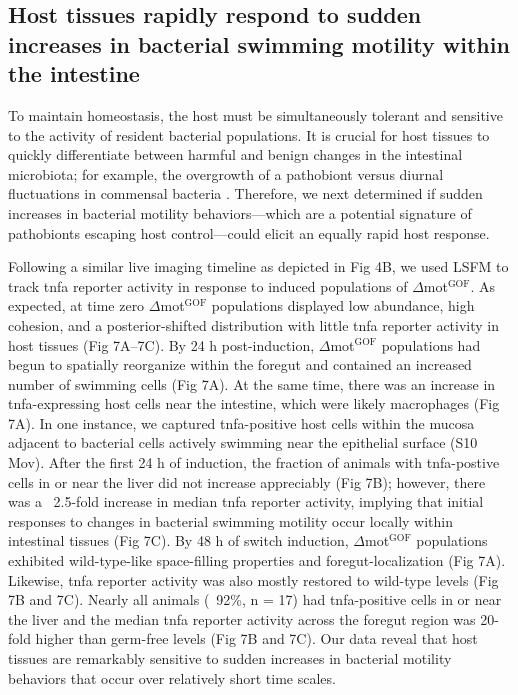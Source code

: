 \subsection{Host tissues rapidly respond to sudden increases in bacterial swimming motility within the intestine} 
To maintain homeostasis, the host must be simultaneously tolerant and sensitive to the activity of resident bacterial populations. It is crucial for host tissues to quickly differentiate between harmful and benign changes in the intestinal microbiota; for example, the overgrowth of a pathobiont versus diurnal fluctuations in commensal bacteria \cite{thaiss_microbiota_2016}. Therefore, we next determined if sudden increases in bacterial motility behaviors—which are a potential signature of pathobionts escaping host control—could elicit an equally rapid host response. 

Following a similar live imaging timeline as depicted in Fig 4B, we used LSFM to track tnfa reporter activity in response to induced populations of $\Delta$mot$^{\text{GOF}}$. As expected, at time zero $\Delta$mot$^{\text{GOF}}$ populations displayed low abundance, high cohesion, and a posterior-shifted distribution with little tnfa reporter activity in host tissues (Fig 7A–7C). By 24 h post-induction, $\Delta$mot$^{\text{GOF}}$ populations had begun to spatially reorganize within the foregut and contained an increased number of swimming cells (Fig 7A). At the same time, there was an increase in tnfa-expressing host cells near the intestine, which were likely macrophages (Fig 7A). In one instance, we captured tnfa-positive host cells within the mucosa adjacent to bacterial cells actively swimming near the epithelial surface (S10 Mov). After the first 24 h of induction, the fraction of animals with tnfa-postive cells in or near the liver did not increase appreciably (Fig 7B); however, there was a ~2.5-fold increase in median tnfa reporter activity, implying that initial responses to changes in bacterial swimming motility occur locally within intestinal tissues (Fig 7C). By 48 h of switch induction, $\Delta$mot$^{\text{GOF}}$ populations exhibited wild-type-like space-filling properties and foregut-localization (Fig 7A). Likewise, tnfa reporter activity was also mostly restored to wild-type levels (Fig 7B and 7C). Nearly all animals (~92\%, n = 17) had tnfa-positive cells in or near the liver and the median tnfa reporter activity across the foregut region was 20-fold higher than germ-free levels (Fig 7B and 7C). Our data reveal that host tissues are remarkably sensitive to sudden increases in bacterial motility behaviors that occur over relatively short time scales. 

